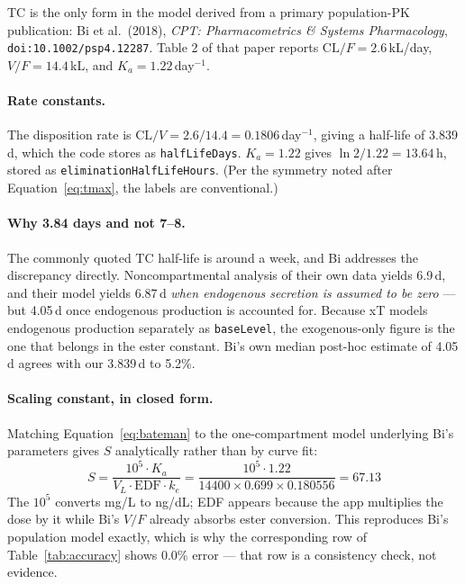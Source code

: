 \documentclass[11pt,a4paper]{article}
\newcommand{\code}[1]{\texttt{\small #1}}
\begin{document}
TC is the only form in the model derived from a primary population-PK
publication: Bi et al.\ (2018), \emph{CPT: Pharmacometrics \& Systems
Pharmacology}, \texttt{doi:10.1002/psp4.12287}. Table 2 of that paper reports
$\mathrm{CL}/F = 2.6$\,kL/day, $V/F = 14.4$\,kL, and $K_a = 1.22$\,day$^{-1}$.

\paragraph{Rate constants.} The disposition rate is
$\mathrm{CL}/V = 2.6/14.4 = 0.1806$\,day$^{-1}$, giving a half-life of 3.839\,d,
which the code stores as \code{halfLifeDays}. $K_a = 1.22$ gives
$\ln 2 / 1.22 = 13.64$\,h, stored as \code{eliminationHalfLifeHours}. (Per the
symmetry noted after Equation~\ref{eq:tmax}, the labels are conventional.)

\paragraph{Why 3.84 days and not 7--8.} The commonly quoted TC half-life is
around a week, and Bi addresses the discrepancy directly. Noncompartmental
analysis of their own data yields 6.9\,d, and their model yields 6.87\,d
\emph{when endogenous secretion is assumed to be zero} --- but 4.05\,d once
endogenous production is accounted for. Because xT models endogenous production
separately as \code{baseLevel}, the exogenous-only figure is the one that belongs
in the ester constant. Bi's own median post-hoc estimate of 4.05\,d agrees with
our 3.839\,d to 5.2\%.

\paragraph{Scaling constant, in closed form.} Matching Equation~\ref{eq:bateman}
to the one-compartment model underlying Bi's parameters gives $S$ analytically
rather than by curve fit:
\begin{equation}
S = \frac{10^5 \cdot K_a}{V_L \cdot \mathrm{EDF} \cdot k_e}
  = \frac{10^5 \cdot 1.22}{14400 \times 0.699 \times 0.180556} = 67.13
\label{eq:tcS}
\end{equation}
The $10^5$ converts mg/L to ng/dL; EDF appears because the app multiplies the dose
by it while Bi's $V/F$ already absorbs ester conversion. This reproduces Bi's
population model exactly, which is why the corresponding row of
Table~\ref{tab:accuracy} shows 0.0\% error --- that row is a consistency check,
not evidence.
\end{document}
